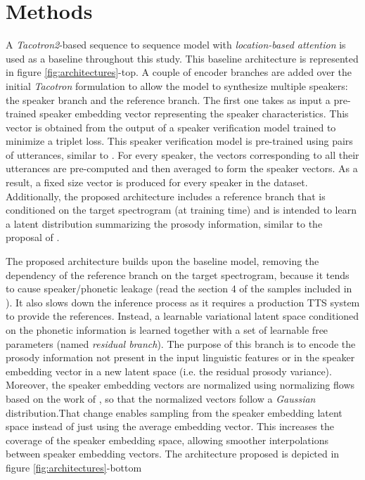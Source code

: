 \section{Methods}
A \textit{Tacotron2}-based sequence to sequence model with \textit{location-based attention} \autocite{Wang2017} is used as a baseline throughout this study. This baseline architecture is represented in figure \ref{fig:architectures}-top. A couple of encoder branches are added over the initial \textit{Tacotron} formulation to allow the model to synthesize multiple speakers: the speaker branch and the reference branch. The first one takes as input a pre-trained speaker embedding vector representing the speaker characteristics. This vector is obtained from the output of a speaker verification model trained to minimize a triplet loss. This speaker verification model is pre-trained using pairs of utterances, similar to  \autocite{Ren2019}. For every speaker, the vectors corresponding to all their utterances are pre-computed and then averaged to form the speaker vectors. As a result, a fixed size vector is produced for every speaker in the dataset. Additionally, the proposed architecture includes a reference branch that is conditioned on the target spectrogram (at training time) and is intended to learn a latent distribution summarizing the prosody information, similar to the proposal of \autocite{skerryryan2018}.




The proposed architecture builds upon the baseline model, removing the dependency of the reference branch on the target spectrogram, because it tends to cause speaker/phonetic leakage (read the section 4 of the samples included in \autocite{skerryryan2018}). It also slows down the inference process as it requires a production TTS system to provide the references. Instead, a learnable variational latent space conditioned on the phonetic information is learned together with a set of learnable free parameters (named \textit{residual branch}). The purpose of this branch is to encode the prosody information not present in the input linguistic features or in the speaker embedding vector in a new latent space (i.e. the residual prosody variance). Moreover, the speaker embedding vectors are normalized using normalizing flows based on the work of \autocite{kingma2018}, so that the normalized vectors follow a \textit{Gaussian} distribution.That change enables sampling from the speaker embedding latent space instead of just using the average embedding vector. This increases the coverage of the speaker embedding space, allowing smoother interpolations between speaker embedding vectors. The architecture proposed is depicted in figure \ref{fig:architectures}-bottom

